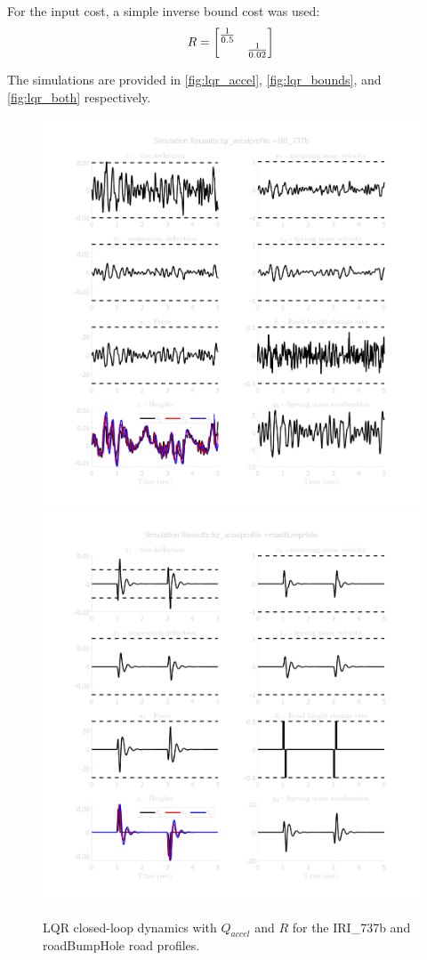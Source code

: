 \documentclass[]{IEEEtran}
\begin{document}
For the input cost, a simple inverse bound cost was used:
\begin{gather}
    R = \mqty[\dmat{\frac{1}{0.5}, \frac{1}{0.02}}]
\end{gather}

The simulations are provided in \autoref{fig:lqr_accel}, \autoref{fig:lqr_bounds}, and \autoref{fig:lqr_both} respectively.

\begin{figure}[h]
    \centering
    \includegraphics[width = 0.49 \columnwidth]{figs/results_lqr_accel_IRI_737b.png}
    \includegraphics[width = 0.49 \columnwidth]{figs/results_lqr_accel_roadBumpHole.png}
    \caption{LQR closed-loop dynamics with $Q_{accel}$ and $R$ for the IRI\_737b  and roadBumpHole road profiles.} \label{fig:lqr_accel}
\end{figure}
\end{document}
